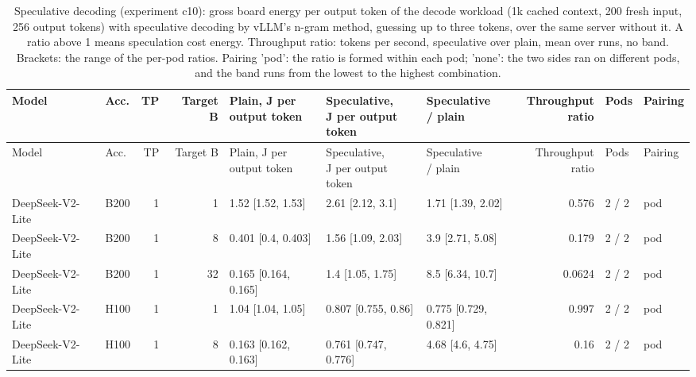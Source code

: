 \begin{landscape}
\begingroup
\scriptsize
\setlength{\tabcolsep}{3pt}
\begin{longtable}{llrrlllrll}
\caption{Speculative decoding (experiment c10): gross board energy per output token of the decode workload (1k cached context, 200 fresh input, 256 output tokens) with speculative decoding by vLLM's n-gram method, guessing up to three tokens, over the same server without it. A ratio above 1 means speculation cost energy. Throughput ratio: tokens per second, speculative over plain, mean over runs, no band. Brackets: the range of the per-pod ratios. Pairing 'pod': the ratio is formed within each pod; 'none': the two sides ran on different pods, and the band runs from the lowest to the highest combination.}\label{tab:speculation}\\
\toprule
Model & Acc. & TP & Target B & \makecell[l]{Plain, J per\\output token} & \makecell[l]{Speculative,\\J per output\\token} & \makecell[l]{Speculative\\/ plain} & \makecell[r]{Throughput\\ratio} & Pods & Pairing \\
\midrule
\endfirsthead
\toprule
Model & Acc. & TP & Target B & \makecell[l]{Plain, J per\\output token} & \makecell[l]{Speculative,\\J per output\\token} & \makecell[l]{Speculative\\/ plain} & \makecell[r]{Throughput\\ratio} & Pods & Pairing \\
\midrule
\endhead
\bottomrule
\endfoot
DeepSeek-V2-Lite & B200 & 1 & 1 & 1.52 {[}1.52, 1.53{]} & 2.61 {[}2.12, 3.1{]} & 1.71 {[}1.39, 2.02{]} & 0.576 & 2 / 2 & pod \\
DeepSeek-V2-Lite & B200 & 1 & 8 & 0.401 {[}0.4, 0.403{]} & 1.56 {[}1.09, 2.03{]} & 3.9 {[}2.71, 5.08{]} & 0.179 & 2 / 2 & pod \\
DeepSeek-V2-Lite & B200 & 1 & 32 & 0.165 {[}0.164, 0.165{]} & 1.4 {[}1.05, 1.75{]} & 8.5 {[}6.34, 10.7{]} & 0.0624 & 2 / 2 & pod \\
DeepSeek-V2-Lite & H100 & 1 & 1 & 1.04 {[}1.04, 1.05{]} & 0.807 {[}0.755, 0.86{]} & 0.775 {[}0.729, 0.821{]} & 0.997 & 2 / 2 & pod \\
DeepSeek-V2-Lite & H100 & 1 & 8 & 0.163 {[}0.162, 0.163{]} & 0.761 {[}0.747, 0.776{]} & 4.68 {[}4.6, 4.75{]} & 0.16 & 2 / 2 & pod \\

\end{longtable}
\end{landscape}
